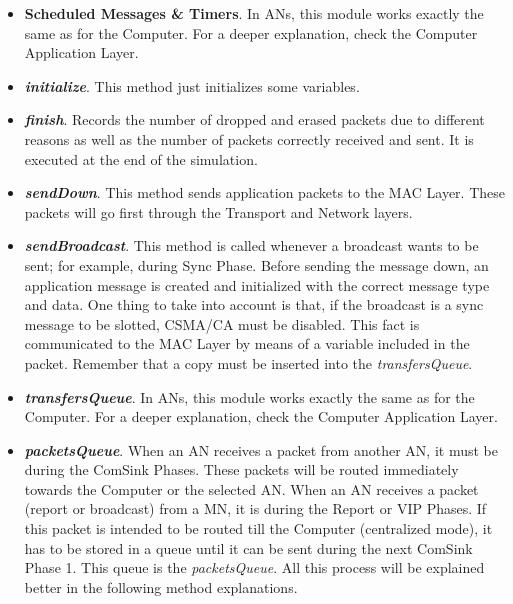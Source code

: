 \begin{itemize}
  \item \textbf{Scheduled Messages \& Timers}. In \acp{AN}, this module works exactly the same as for the Computer. For a deeper explanation, check
  the Computer Application Layer.

  \item \textbf{\textit{initialize}}. This method just initializes some variables.

  \item \textbf{\textit{finish}}. Records the number of dropped and erased packets due to different reasons as well as the number of packets
  correctly received and sent. It is executed at the end of the simulation.

  \item \textbf{\textit{sendDown}}. This method sends application packets to the \ac{MAC} Layer. These packets will go first through the Transport 
  and Network layers.

  \item \textbf{\textit{sendBroadcast}}. This method is called whenever a broadcast wants to be sent; for example, during Sync Phase. Before sending
  the message down, an application message is created and initialized with the correct message type and data. One thing to take into account is that,
  if the broadcast is a sync message to be slotted, \ac{CSMA/CA} must be disabled. This fact is communicated to the \ac{MAC} Layer by means of a 
  variable included in the packet. Remember that a copy must be inserted into the \textit{transfersQueue}.

  \item \textbf{\textit{transfersQueue}}. In \acp{AN}, this module works exactly the same as for the Computer. For a deeper explanation, check
  the Computer Application Layer.

  \item \textbf{\textit{packetsQueue}}. When an \ac{AN} receives a packet from another \ac{AN}, it must be during the ComSink Phases. These packets
  will be routed immediately towards the Computer or the selected \ac{AN}. When an \ac{AN} receives a packet (report or broadcast) from a \ac{MN}, 
  it is during the Report or \ac{VIP} Phases. If this packet is intended to be routed till the Computer (centralized mode), it has to be stored in 
  a queue until it can be sent during the next ComSink Phase 1. This queue is the \textit{packetsQueue}. All this process will be explained better 
  in the following method explanations.


\end{itemize}
